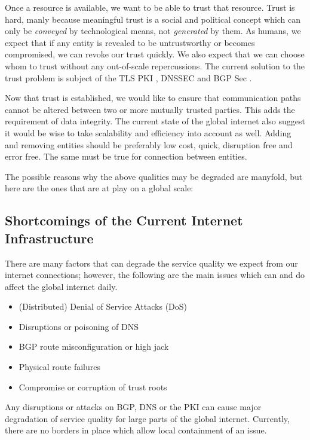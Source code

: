 \documentclass[../eva1_scion.tex]{subfiles}
\begin{document}
Once a resource is available, we want to be able to trust that resource. Trust is hard, manly because meaningful trust is a social and political concept which can only be \textit{conveyed} by technological means, not \textit{generated} by them. As humans, we expect that if any entity is revealed to be untrustworthy or becomes compromised, we can revoke our trust quickly. We also expect that we can choose whom to trust without any out-of-scale repercussions. The current solution to the trust problem is subject of the TLS PKI \cite{rfc_pki}, DNSSEC \cite{rfc_dnssec} and BGP Sec \cite{rfc_bgpsec}.

Now that trust is established, we would like to ensure that communication paths cannot be altered between two or more mutually trusted parties. This adds the requirement of data integrity. The current state of the global internet also suggest it would be wise to take scalability and efficiency into account as well. Adding and removing entities should be preferably low cost, quick, disruption free and error free. The same must be true for connection between entities.

The possible reasons why the above qualities may be degraded are manyfold, but here are the ones that are at play on a global scale:

\subsection{Shortcomings of the Current Internet Infrastructure}%
\label{ssec:shortcomings}

There are many factors that can degrade the service quality we expect from our internet connections; however, the following are the main issues which can and do affect the global internet daily.

    \begin{itemize}
        \item (Distributed) Denial of Service Attacks (DoS)
        \item Disruptions or poisoning of DNS
        \item BGP route misconfiguration or high jack
        \item Physical route failures
        \item Compromise or corruption of trust roots
    \end{itemize}

    Any disruptions or attacks on BGP, DNS or the PKI can cause major degradation of service quality for large parts of the global internet. Currently, there are no borders in place which allow local containment of an issue.
\end{document}
